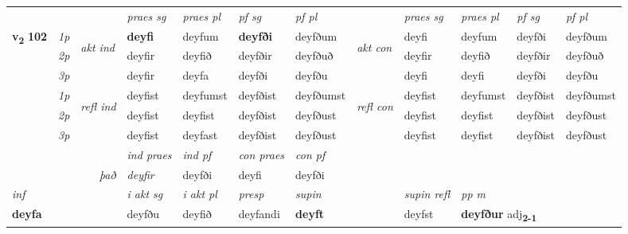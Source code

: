 \begin{longtable}[l]{X>{\footnotesize\itshape}llXXXXlXXXX}
 & &   & \textit{praes sg}  & \textit{praes pl}    & \textit{ pf sg} & \textit{pf pl} & & \textit{praes sg}  & \textit{praes pl}    & \textit{pf sg} & \textit{pf pl }  \\ \cmidrule{4-7} \cmidrule{9-12}
 \multirow{2}{*}{{{\textbf{v{\textsubscript{2}}} \Large{\textbf{102}}}}}  & 1p & \multirow{3}{*}{\begin{turn}{90}\textit{akt ind}\end{turn}} & \textbf{deyfi} & deyfum & \textbf{deyfði} & deyfðum & \multirow{3}{*}{\begin{turn}{90}\textit{akt con}\end{turn}} &deyfi & deyfum & deyfði & deyfðum\\*
 & 2p &  &  deyfir  & deyfið & deyfðir & deyfðuð & & deyfir & deyfið & deyfðir & deyfðuð \\*
 & 3p &  & deyfir & deyfa & deyfði & deyfðu & & deyfi & deyfi& deyfði & deyfðu \\*
\cmidrule{4-7} \cmidrule{9-12}
 & 1p & \multirow{3}{*}{\begin{turn}{90}\textit{refl ind}\end{turn}}  & deyfist & deyfumst & deyfðist & deyfðumst & \multirow{3}{*}{\begin{turn}{90}\textit{refl con}\end{turn}}  &deyfist & deyfumst & deyfðist & deyfðumst \\*
 & 2p &  & deyfist & deyfist & deyfðist & deyfðust & &deyfist & deyfist & deyfðist & deyfðust \\*
 & 3p  & & deyfist & deyfast & deyfðist & deyfðust & & deyfist & deyfist& deyfðist & deyfðust \\*
\cmidrule{4-7} \cmidrule{9-12}

   && &  \textit{ind praes} & \textit{ind pf} & \textit{con praes} & \textit{con pf} \\*
\multicolumn{3}{r}{\textit{það}} & deyfir & deyfði & deyfi & deyfði \\*

\cmidrule{4-7}
   {\textit{inf}} & &  & \textit{i akt sg} & \textit{i akt pl}   & \textit{presp} & \textit{supin} && \textit{supin refl} & \textit{pp m} \\*
  {\textbf{deyfa}} & && deyfðu  & deyfið   & deyfandi &  \textbf{deyft} && deyfst & \multicolumn{2}{l}{\textbf{deyfður} adj\textbf{\textsubscript{2-1}}} \\*

\midrule


\end{longtable}
